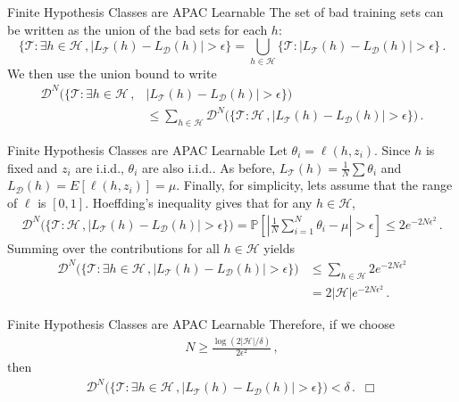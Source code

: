 \documentclass[10pt, table, handout]{beamer}
\newcommand{\cT}{\ensuremath{\mathcal{T}}}
\newcommand{\cD}{\ensuremath{\mathcal{D}}}
\newcommand{\cH}{\ensuremath{\mathcal{H}}}
\newcommand{\bP}{\ensuremath{\mathbb{P}}}
\begin{document}
\begin{frame}[fragile]{Finite Hypothesis Classes are APAC Learnable}
The set of bad training sets can be written as the union of the bad sets for each $h$: 
$$
\big\{\cT:\exists h\in \mathcal{H}\,,|L_\cT(h)-L_\cD(h)|>\epsilon\big\} = \bigcup_{h\in\cH} \big\{\cT:|L_\cT(h)-L_\cD(h)|>\epsilon\big\}\,.
$$\pause
We then use the union bound to write
\begin{align*}
\cD^N\Big(\big\{\cT:\exists h\in \mathcal{H}\,,&|L_\cT(h)-L_\cD(h)|>\epsilon\big\}\Big)
\\
&\leq \sum_{h\in\cH}\cD^N\Big(\big\{\cT:\mathcal{H}\,,|L_\cT(h)-L_\cD(h)|>\epsilon\big\}\Big)\,.
\end{align*}
\end{frame}




\begin{frame}[fragile]{Finite Hypothesis Classes are APAC Learnable}
Let $\theta_i = \ell(h,z_i)$. Since $h$ is fixed and $z_i$ are i.i.d., $\theta_i$ are also i.i.d.. As before, $L_\cT(h) = \frac{1}{N}\sum\theta_i$ and $L_\cD(h) = E[\ell(h,z_i)] = \mu$. Finally, for simplicity, lets assume that the range of $\ell$ is $[0,1]$. \pause Hoeffding's inequality gives that for any $h\in \cH$,
\begin{align*}
\cD^N\Big(\big\{\cT:\mathcal{H}\,,|L_\cT(h)-L_\cD(h)|>\epsilon\big\}\Big) 
= \bP\left[\left| \frac{1}{N}\sum_{i=1}^N\theta_i-\mu \right|>\epsilon\right] \leq 2e^{-2N\epsilon^2}\,.
\end{align*}\pause
Summing over the contributions for all $h\in \cH$ yields
\begin{align*}
\cD^N\Big(\big\{\cT:\exists h\in \mathcal{H}\,,|L_\cT(h)-L_\cD(h)|>\epsilon\big\}\Big)&\leq \sum_{h\in\cH}2e^{-2N\epsilon^2}
\\
&=2|\cH|e^{-2N\epsilon^2}\,.
\end{align*}
\end{frame}




\begin{frame}[fragile]{Finite Hypothesis Classes are APAC Learnable}
Therefore, if we choose
\begin{align*}
N\geq \frac{\log(2|\cH|/\delta)}{2\epsilon^2}\,,
\end{align*}
then 
\begin{align*}
\cD^N\Big(\big\{\cT:\exists h\in \mathcal{H}\,,|L_\cT(h)-L_\cD(h)|>\epsilon\big\}\Big)<\delta\,.\,\,\,\Box
\end{align*}
\end{frame}
\end{document}
